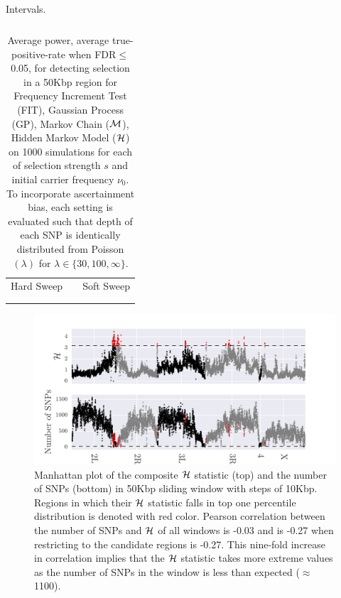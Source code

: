 \documentclass[11pt]{article}
\begin{document}
\begin{table}[h]
	\centering
	\begin{tabular}{c}
		
	\end{tabular}
	\caption{Intervals.}\label{tab:intervals}
\end{table}

\begin{table}[h]
	\centering
	\begin{tabular}{ccc}
		Hard Sweep & &Soft Sweep\\ \\  
		
		&&
	\end{tabular}
	\caption{Average power, average true-positive-rate when FDR$\le$0.05, for 
		detecting selection in a 50Kbp region for Frequency Increment Test 
		(FIT), 
		Gaussian Process (GP), Markov Chain (${\cal M}$), Hidden Markov Model 
		(${\cal H}$) on 
		1000 
		simulations for each of selection strength $s$ and initial 
		carrier frequency $\nu_0$. To incorporate ascertainment bias, each 
		setting is evaluated such that depth of each SNP is identically 
		distributed from Poisson$(\lambda)$ for $\lambda \in 
		\{30,100,\infty\}$.}\label{tab:power}
\end{table}


\begin{figure}[H]
	\centering
	\includegraphics[width=\textwidth]{figures/manhattan.pdf}
	\caption{Manhattan plot of the composite ${\cal H}$ statistic (top) 
	and the number of SNPs (bottom) in 50Kbp sliding window with steps of 
	10Kbp. Regions in which their ${\cal H}$ statistic falls in top one percentile 
	distribution is denoted with red color. Pearson correlation between the 
	number of SNPs and 
	${\cal H}$ of all windows is -0.03 and is -0.27 when restricting to the 
	candidate regions is -0.27. This 
	nine-fold increase in correlation implies that the ${\cal H}$ statistic takes 
	more extreme values as the number of SNPs in the window is less than 
	expected ($\approx$1100). } 
	\label{fig:manhattan}
\end{figure}
\end{document}
